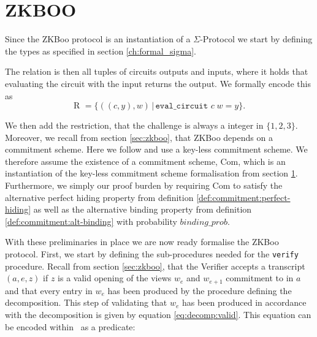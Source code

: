 \section{ZKBOO}
\label{sec:formal_zkboo}
Since the ZKBoo protocol is an instantiation of a $\Sigma$-Protocol we start by
defining the types as specified in section \ref{ch:formal_sigma}.




The relation is then all tuples of circuits outputs and inputs, where it holds that evaluating the circuit with the input returns the output. We formally encode this as
\begin{equation}
  \text{R } = \{((c,y), w) \,|\, \texttt{eval\_circuit } c \; w = y\}.
\end{equation}

We then add the restriction, that the challenge is always a integer in
$\{1,2,3\}$. Moreover, we recall from section \ref{sec:zkboo}, that ZKBoo
depends on a commitment scheme. Here we follow \cite{zkboo} and use a key-less
commitment scheme. We therefore assume the existence of a commitment scheme,
Com, which is an instantiation of the key-less commitment scheme formalisation
from section \ref{sec:formal_zkboo}. Furthermore, we simply our proof burden by
requiring Com to satisfy the alternative perfect hiding property from definition
\ref{def:commitment:perfect-hiding} as well as the alternative binding property
from definition \ref{def:commitment:alt-binding} with probability $binding\_prob$.

With these preliminaries in place we are now ready formalise the ZKBoo protocol.
First, we start by defining the sub-procedures needed for the \texttt{verify}
procedure. Recall from section \ref{sec:zkboo}, that the Verifier accepts a
transcript $(a,e,z)$ if $z$ is a valid opening of the views $w_{e}$ and
$w_{e+1}$ commitment to in $a$ and that every entry in $w_{e}$ has been produced
by the procedure defining the decomposition. This step of validating that
$w_{e}$ has been produced in accordance with the decomposition is given 
by equation \ref{eq:decomp:valid}.
%
This equation can be encoded within \easycrypt\ as a predicate:


